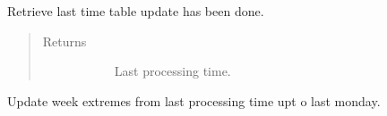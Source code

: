 \documentclass[letterpaper,10pt,english]{sphinxmanual}
\begin{document}
\begin{fulllineitems}
\label{\detokenize{autoapi/src/utils/snowflake/index:src.utils.snowflake.get_last_processed_time}}
Retrieve last time table update has been done.
\begin{quote}\begin{description}
\item[{Returns}] \leavevmode\begin{description}
\item[{}] \leavevmode
Last processing time.

\end{description}

\end{description}\end{quote}

\end{fulllineitems}


\begin{fulllineitems}
\label{\detokenize{autoapi/src/utils/snowflake/index:src.utils.snowflake.update_week_extremes}}
Update week extremes from last processing time upt o last monday.

\end{fulllineitems}

\end{document}
